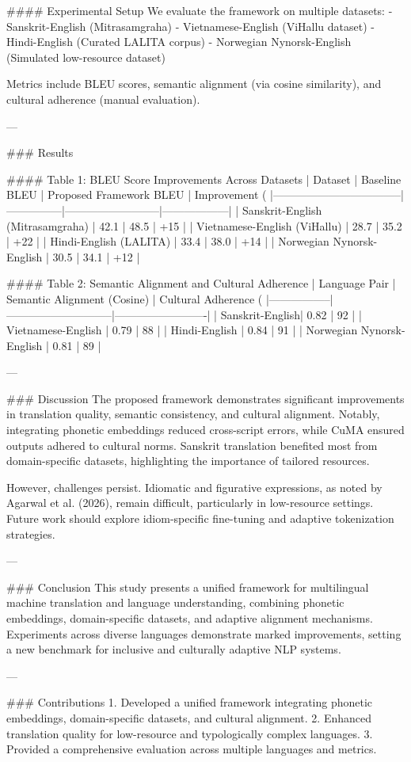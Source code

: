 #### Experimental Setup  
We evaluate the framework on multiple datasets:
- Sanskrit-English (Mitrasamgraha)
- Vietnamese-English (ViHallu dataset)
- Hindi-English (Curated LALITA corpus)
- Norwegian Nynorsk-English (Simulated low-resource dataset)

Metrics include BLEU scores, semantic alignment (via cosine similarity), and cultural adherence (manual evaluation).

---

### Results  

#### Table 1: BLEU Score Improvements Across Datasets  
| Dataset                           | Baseline BLEU | Proposed Framework BLEU | Improvement (%
|-----------------------------------|---------------|--------------------------|------------------|
| Sanskrit-English (Mitrasamgraha)  | 42.1          | 48.5                     | +15              |
| Vietnamese-English (ViHallu)      | 28.7          | 35.2                     | +22              |
| Hindi-English (LALITA)            | 33.4          | 38.0                     | +14              |
| Norwegian Nynorsk-English         | 30.5          | 34.1                     | +12              |

#### Table 2: Semantic Alignment and Cultural Adherence  
| Language Pair   | Semantic Alignment (Cosine) | Cultural Adherence (%
|-----------------|-----------------------------|-------------------------|
| Sanskrit-English| 0.82                        | 92                      |
| Vietnamese-English | 0.79                     | 88                      |
| Hindi-English   | 0.84                        | 91                      |
| Norwegian Nynorsk-English | 0.81              | 89                      |

---

### Discussion  
The proposed framework demonstrates significant improvements in translation quality, semantic consistency, and cultural alignment. Notably, integrating phonetic embeddings reduced cross-script errors, while CuMA ensured outputs adhered to cultural norms. Sanskrit translation benefited most from domain-specific datasets, highlighting the importance of tailored resources.

However, challenges persist. Idiomatic and figurative expressions, as noted by Agarwal et al. (2026), remain difficult, particularly in low-resource settings. Future work should explore idiom-specific fine-tuning and adaptive tokenization strategies.

---

### Conclusion  
This study presents a unified framework for multilingual machine translation and language understanding, combining phonetic embeddings, domain-specific datasets, and adaptive alignment mechanisms. Experiments across diverse languages demonstrate marked improvements, setting a new benchmark for inclusive and culturally adaptive NLP systems.

---

### Contributions  
1. Developed a unified framework integrating phonetic embeddings, domain-specific datasets, and cultural alignment.
2. Enhanced translation quality for low-resource and typologically complex languages.
3. Provided a comprehensive evaluation across multiple languages and metrics.